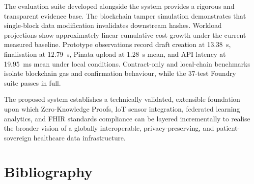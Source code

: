 \documentclass[12pt,a4wide]{report}
\begin{document}
The evaluation suite developed alongside the system provides a rigorous and
transparent evidence base. The blockchain tamper simulation demonstrates that
single-block data modification invalidates downstream hashes. Workload projections
show approximately linear cumulative cost growth under the current measured
baseline. Prototype observations record draft creation at 13.38~s, finalisation
at 12.79~s, Pinata upload at 1.28~s mean, and API latency at 19.95~ms mean under
local conditions. Contract-only and local-chain benchmarks isolate blockchain
gas and confirmation behaviour, while the 37-test Foundry suite passes in full.

The proposed system establishes a technically validated, extensible foundation upon which
Zero-Knowledge Proofs, IoT sensor integration, federated learning analytics, and
FHIR standards compliance can be layered incrementally to realise the broader
vision of a globally interoperable, privacy-preserving, and patient-sovereign
healthcare data infrastructure.

\chapter*{Bibliography}
\end{document}
